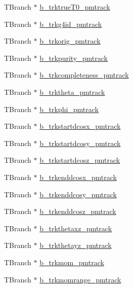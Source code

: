 \begin{DoxyCompactItemize}
\item 
T\-Branch $\ast$ \hyperlink{classanatree_a34c8d5f821ce93c2e0859ecec72b6484}{b\-\_\-trktrue\-T0\-\_\-pmtrack}
\item 
T\-Branch $\ast$ \hyperlink{classanatree_a00dcbd3c1b7f5292070196712c827f31}{b\-\_\-trkg4id\-\_\-pmtrack}
\item 
T\-Branch $\ast$ \hyperlink{classanatree_a899eb69e6decc594b6b2f9f0e99cabc6}{b\-\_\-trkorig\-\_\-pmtrack}
\item 
T\-Branch $\ast$ \hyperlink{classanatree_ab760353df144ef75e96fe6b08f61d407}{b\-\_\-trkpurity\-\_\-pmtrack}
\item 
T\-Branch $\ast$ \hyperlink{classanatree_a9311a2e8106df4e646f1e03832b8e2b2}{b\-\_\-trkcompleteness\-\_\-pmtrack}
\item 
T\-Branch $\ast$ \hyperlink{classanatree_a1de5332e834fd99b4b979531a783a0b7}{b\-\_\-trktheta\-\_\-pmtrack}
\item 
T\-Branch $\ast$ \hyperlink{classanatree_a597bd5a7432cb07f07aab4c5b8f7748d}{b\-\_\-trkphi\-\_\-pmtrack}
\item 
T\-Branch $\ast$ \hyperlink{classanatree_aa04ac1fdf4ec30016627e53978ae692e}{b\-\_\-trkstartdcosx\-\_\-pmtrack}
\item 
T\-Branch $\ast$ \hyperlink{classanatree_afb38adb7fc5053eb4e3e324123a1351e}{b\-\_\-trkstartdcosy\-\_\-pmtrack}
\item 
T\-Branch $\ast$ \hyperlink{classanatree_a827ce566874562399b3222d966adbb21}{b\-\_\-trkstartdcosz\-\_\-pmtrack}
\item 
T\-Branch $\ast$ \hyperlink{classanatree_a066e97c989f79e437f2ffd1769c48296}{b\-\_\-trkenddcosx\-\_\-pmtrack}
\item 
T\-Branch $\ast$ \hyperlink{classanatree_abdb7f155ee425a630176bfa61c1774dc}{b\-\_\-trkenddcosy\-\_\-pmtrack}
\item 
T\-Branch $\ast$ \hyperlink{classanatree_ac4c4cbce176d24bf41cf72d66a1a5126}{b\-\_\-trkenddcosz\-\_\-pmtrack}
\item 
T\-Branch $\ast$ \hyperlink{classanatree_ac2cbe06f8207532244b90074b0c638e0}{b\-\_\-trkthetaxz\-\_\-pmtrack}
\item 
T\-Branch $\ast$ \hyperlink{classanatree_a10e874ea3fc896377207c3216f97fd3c}{b\-\_\-trkthetayz\-\_\-pmtrack}
\item 
T\-Branch $\ast$ \hyperlink{classanatree_a1d52f3502b617cefdec02b0ccc626085}{b\-\_\-trkmom\-\_\-pmtrack}
\item 
T\-Branch $\ast$ \hyperlink{classanatree_a5bb02256a7a2f3b81fbc3567f1241f63}{b\-\_\-trkmomrange\-\_\-pmtrack}

\end{DoxyCompactItemize}
